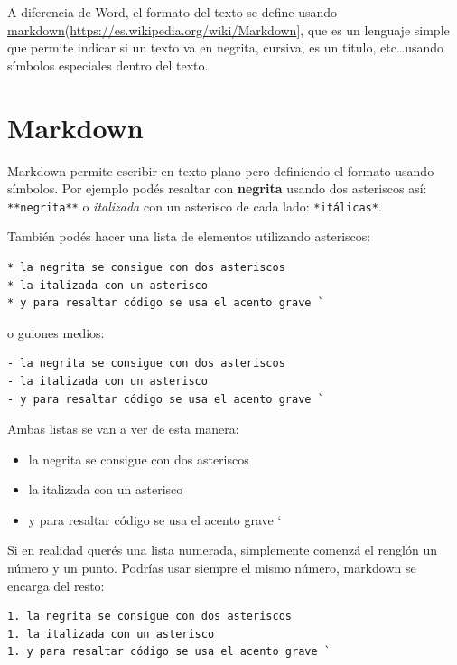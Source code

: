 \documentclass[
  openany]{book}
\providecommand{\tightlist}{%
  \setlength{\itemsep}{0pt}\setlength{\parskip}{0pt}}
\begin{document}
A diferencia de Word, el formato del texto se define usando \protect\hyperlink{markdown}{markdown}(\url{https://es.wikipedia.org/wiki/Markdown}{]}, que es un lenguaje simple que permite indicar si un texto va en negrita, cursiva, es un título, etc\ldots usando símbolos especiales dentro del texto.

\hypertarget{markdown}{%
\section{Markdown}\label{markdown}}

Markdown permite escribir en texto plano pero definiendo el formato usando símbolos.
Por ejemplo podés resaltar con \textbf{negrita} usando dos asteriscos así: \texttt{**negrita**} o \emph{italizada} con un asterisco de cada lado: \texttt{*itálicas*}.

También podés hacer una lista de elementos utilizando asteriscos:

\begin{verbatim}
* la negrita se consigue con dos asteriscos
* la italizada con un asterisco
* y para resaltar código se usa el acento grave `
\end{verbatim}

o guiones medios:

\begin{verbatim}
- la negrita se consigue con dos asteriscos
- la italizada con un asterisco
- y para resaltar código se usa el acento grave `
\end{verbatim}

Ambas listas se van a ver de esta manera:

\begin{itemize}
\tightlist
\item
  la negrita se consigue con dos asteriscos
\item
  la italizada con un asterisco
\item
  y para resaltar código se usa el acento grave `
\end{itemize}

Si en realidad querés una lista numerada, simplemente comenzá el renglón un número y un punto.
Podrías usar siempre el mismo número, markdown se encarga del resto:

\begin{verbatim}
1. la negrita se consigue con dos asteriscos
1. la italizada con un asterisco
1. y para resaltar código se usa el acento grave `
\end{verbatim}
\end{document}
